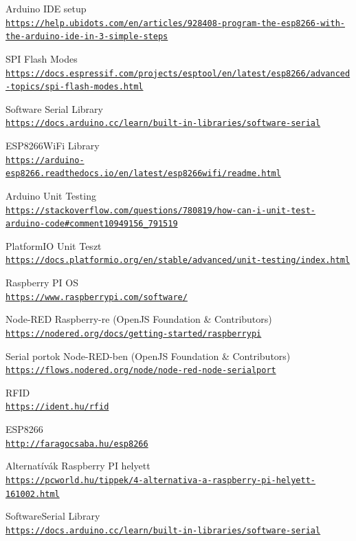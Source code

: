 \documentclass[
]{thesis-ekf}
\theoremstyle{definition}
\theoremstyle{remark}
\begin{document}
\begin{thebibliography}{2}
 Arduino IDE setup
    \\\texttt{\url{https://help.ubidots.com/en/articles/928408-program-the-esp8266-with-the-arduino-ide-in-3-simple-steps}}

 SPI Flash Modes
    \\\texttt{\url{https://docs.espressif.com/projects/esptool/en/latest/esp8266/advanced-topics/spi-flash-modes.html}}

 Software Serial Library
    \\\texttt{\url{https://docs.arduino.cc/learn/built-in-libraries/software-serial}}

 ESP8266WiFi Library
    \\\texttt{\url{https://arduino-esp8266.readthedocs.io/en/latest/esp8266wifi/readme.html}}

 Arduino Unit Testing
    \\\texttt{\url{https://stackoverflow.com/questions/780819/how-can-i-unit-test-arduino-code\#comment10949156\_791519}}

 PlatformIO Unit Teszt
    \\\texttt{\url{https://docs.platformio.org/en/stable/advanced/unit-testing/index.html}}


 Raspberry PI OS
    \\\texttt{\url{https://www.raspberrypi.com/software/}}

 Node-RED Raspberry-re (OpenJS Foundation \& Contributors)
    \\\texttt{\url{https://nodered.org/docs/getting-started/raspberrypi}}

 Serial portok Node-RED-ben (OpenJS Foundation \& Contributors)
    \\\texttt{\url{https://flows.nodered.org/node/node-red-node-serialport}}

 RFID
    \\\texttt{\url{https://ident.hu/rfid}}

 ESP8266
    \\\texttt{\url{http://faragocsaba.hu/esp8266}}

 Alternatívák Raspberry PI helyett
    \\\texttt{\url{https://pcworld.hu/tippek/4-alternativa-a-raspberry-pi-helyett-161002.html}}

 SoftwareSerial Library
    \\\texttt{\url{https://docs.arduino.cc/learn/built-in-libraries/software-serial}}


\end{thebibliography}
\end{document}
